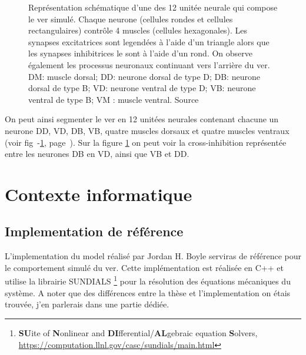 \begin{figure}[ht]
   \begin{center}
   \end{center}
   \caption[Représentation d'une unité neural de \celeg{}]{Représentation schématique d'une des 12 unitée neurale qui compose
   le ver simulé. Chaque neurone (cellules rondes et cellules rectangulaires)
   contrôle 4 muscles (cellules hexagonales).  Les synapses excitatrices sont
   legendées à l'aide d'un triangle alors que les synapses inhibitrices le sont
   à l'aide d'un rond.  On observe également les processus neuronaux continuant
   vers l'arrière du ver.  DM: muscle dorsal; DD: neurone dorsal de type D; DB:
   neurone dorsal de type B; VD: neurone ventral de type D; VB: neurone ventral
   de type B; VM : muscle ventral.  Source \cite{Boyle2009}}
   \label{fig:celegans_segment}
\end{figure}

On peut ainsi segmenter le ver en 12 unitées neurales contenant chacune un neurone DD, VD,
DB, VB, quatre muscles dorsaux et quatre muscles ventraux (voir fig~-\ref{fig:celegans_segment},
page~\pageref{fig:celegans_segment}). Sur la figure \ref{fig:celegans_segment} on peut voir la
cross-inhibition représentée entre les neurones DB en VD, ainsi que VB et DD.



\section{Contexte informatique} %
\label{sec:Contexte informatique}

\subsection{Implementation de référence} %
\label{sub:Implementation de référence}

L'implementation du model réalisé par Jordan H. Boyle serviras de référence
pour le comportement simulé du ver. Cette implémentation est réalisée en C++ et
utilise la librairie SUNDIALS \footnote{\textbf{SU}ite of \textbf{N}onlinear and
\textbf{DI}fferential/\textbf{AL}gebraic equation \textbf{S}olvers,
\url{https://computation.llnl.gov/casc/sundials/main.html}} pour la résolution
des équations mécaniques du système. A noter que des différences entre la thèse
et l'implementation on étais trouvée, j'en parlerais dans une partie dédiée.


